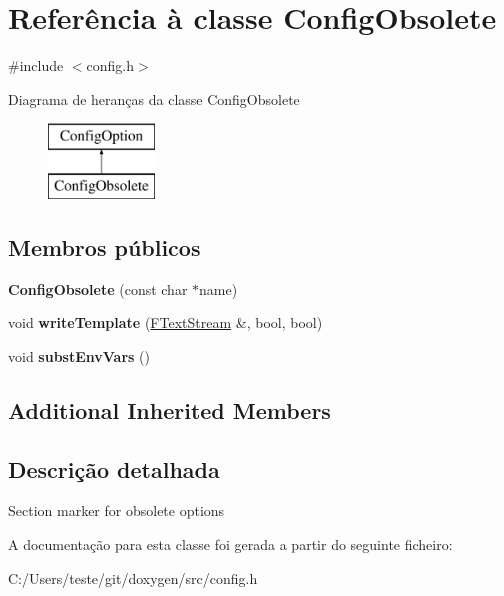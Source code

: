 \hypertarget{class_config_obsolete}{\section{Referência à classe Config\-Obsolete}
\label{class_config_obsolete}
}


{\ttfamily \#include $<$config.\-h$>$}

Diagrama de heranças da classe Config\-Obsolete\begin{figure}[H]
\begin{center}
\leavevmode
\includegraphics[height=2.000000cm]{class_config_obsolete}
\end{center}
\end{figure}
\subsection*{Membros públicos}
\begin{DoxyCompactItemize}
\item 
\hypertarget{class_config_obsolete_a9f13277a7fc777cdd0fa2e67fdad06f0}{{\bfseries Config\-Obsolete} (const char $\ast$name)}\label{class_config_obsolete_a9f13277a7fc777cdd0fa2e67fdad06f0}

\item 
\hypertarget{class_config_obsolete_a7532aae29d4f94af257d952948ec64ca}{void {\bfseries write\-Template} (\hyperlink{class_f_text_stream}{F\-Text\-Stream} \&, bool, bool)}\label{class_config_obsolete_a7532aae29d4f94af257d952948ec64ca}

\item 
\hypertarget{class_config_obsolete_a79866440425087f224d4f77311efad6a}{void {\bfseries subst\-Env\-Vars} ()}\label{class_config_obsolete_a79866440425087f224d4f77311efad6a}

\end{DoxyCompactItemize}
\subsection*{Additional Inherited Members}


\subsection{Descrição detalhada}
Section marker for obsolete options 

A documentação para esta classe foi gerada a partir do seguinte ficheiro\-:\begin{DoxyCompactItemize}
\item 
C\-:/\-Users/teste/git/doxygen/src/config.\-h\end{DoxyCompactItemize}
